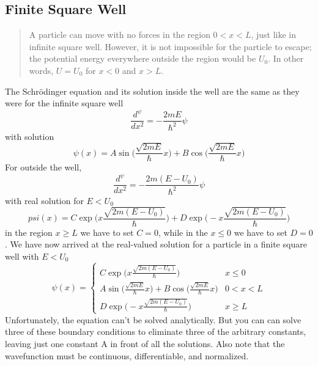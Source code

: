\documentclass[../../main.tex]{subfiles}
\begin{document}
\subsection{Finite Square Well}
\begin{quote}
    A particle can move with no forces in the region $0 < x < L$, just like in infinite square well. However, it is not impossible for the particle to escape; the potential energy everywhere outside the region would be $U_0$. In other words, $U=U_0$ for $x < 0$ and $x > L$.
\end{quote} 
The Schrödinger equation and its solution inside the well are the same as they were for the
infinite square well 
\begin{equation*}
    \frac{d^\psi}{dx^2}=-\frac{2mE}{\hbar^2}\psi
\end{equation*}
with solution
\begin{equation*}
    \psi(x)=A\sin \biggl(\frac{\sqrt{2mE}}{\hbar} x\biggr)+ B \cos \biggl(\frac{\sqrt{2mE}}{\hbar} x\biggr)
\end{equation*}
For outside the well,
\begin{equation*}
    \frac{d^\psi}{dx^2}=-\frac{2m(E-U_0)}{\hbar^2}\psi
\end{equation*}
with real solution for $E < U_0$
\begin{equation*}
    psi(x)=C\exp\biggl( x{\frac{\sqrt{2m(E-U_0)}}{\hbar}} \biggr)+D\exp\biggl( -x{\frac{\sqrt{2m(E-U_0)}}{\hbar}} \biggr)
\end{equation*}
in the region $x \geq L$ we have to set $C = 0$, while in the $x \leq 0$ we have to set $D = 0$.  We have now arrived at the real-valued solution for a particle in a finite square well with $E < U_0$
\begin{equation*}
    \psi(x)=\begin{cases}
        C\exp\biggl( x{\frac{\sqrt{2m(E-U_0)}}{\hbar}} \biggr)&x\leq 0\\
        A\sin \biggl(\frac{\sqrt{2mE}}{\hbar} x\biggr)+ B \cos \biggl(\frac{\sqrt{2mE}}{\hbar} x\biggr)& 0 < x < L\\
        D\exp\biggl( -x{\frac{\sqrt{2m(E-U_0)}}{\hbar}} \biggr)&x\geq L
    \end{cases}
\end{equation*}
Unfortunately, the equation can't be solved analytically. But you can can solve three of these boundary conditions to eliminate three of the arbitrary constants, leaving just one constant A in front of all the solutions. Also note that the wavefunction must be continuous, differentiable, and normalized.
\end{document}
